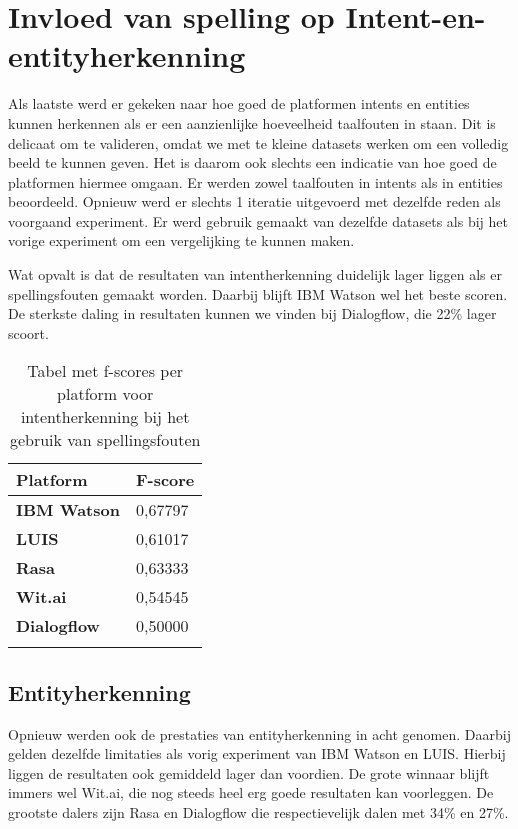 \section{Invloed van spelling op Intent-en-entityherkenning}

Als laatste werd er gekeken naar hoe goed de platformen intents en entities kunnen herkennen als er een aanzienlijke hoeveelheid taalfouten in staan. Dit is delicaat om te valideren, omdat we met te kleine datasets werken om een volledig beeld te kunnen geven. Het is daarom ook slechts een indicatie van hoe goed de platformen hiermee omgaan. Er werden zowel taalfouten in intents als in entities beoordeeld. Opnieuw werd er slechts 1 iteratie uitgevoerd met dezelfde reden als voorgaand experiment. Er werd gebruik gemaakt van dezelfde datasets als bij het vorige experiment om een vergelijking te kunnen maken.

Wat opvalt is dat de resultaten van intentherkenning duidelijk lager liggen als er spellingsfouten gemaakt worden. Daarbij blijft IBM Watson wel het beste scoren. De sterkste daling in resultaten kunnen we vinden bij Dialogflow, die 22\% lager scoort.

\begin{center}
    \begin{longtable}{| l | l |}
        \hline
        \textbf{Platform} & \textbf{F-score} \\ \hline
        \textbf{IBM Watson} & 0,67797 \\ \hline  
        \textbf{LUIS} & 0,61017 \\ \hline  
        \textbf{Rasa} & 0,63333 \\ \hline  
        \textbf{Wit.ai} & 0,54545  \\ \hline  
        \textbf{Dialogflow} & 0,50000 \\ \hline  
        \caption{Tabel met f-scores per platform voor intentherkenning bij het gebruik van spellingsfouten}                                    
    \end{longtable}
    \label{tbl:results-intent-spelling}
\end{center}

\subsection{Entityherkenning}

Opnieuw werden ook de prestaties van entityherkenning in acht genomen. Daarbij gelden dezelfde limitaties als vorig experiment van IBM Watson en LUIS. Hierbij liggen de resultaten ook gemiddeld lager dan voordien. De grote winnaar blijft immers wel Wit.ai, die nog steeds heel erg goede resultaten kan voorleggen. De grootste dalers zijn Rasa en Dialogflow die respectievelijk dalen met 34\% en 27\%.

